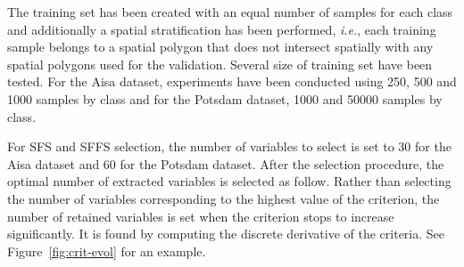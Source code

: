 \documentclass[journal]{IEEEtran}
\begin{document}
    The training set has been created  with an equal number of samples
    for each class and additionally  a spatial stratification has been
    performed, \emph{i.e.}, each training  sample belongs to a spatial
    polygon  that  does  not  intersect  spatially  with  any  spatial
    polygons used  for the validation.   Several size of  training set
    have been  tested.  For  the Aisa  dataset, experiments  have been
    conducted using  250, 500 and  1000 samples  by class and  for the
    Potsdam dataset, 1000 and 50000 samples by class.

    For SFS and  SFFS selection, the number of variables  to select is
    set to  30 for the  Aisa dataset and  60 for the  Potsdam dataset.
    After  the selection  procedure, the  optimal number  of extracted
    variables is selected as follow.  Rather than selecting the number
    of variables corresponding to the  highest value of the criterion,
    the number of  retained variables is set when  the criterion stops
    to increase significantly.  It is  found by computing the discrete
    derivative of the criteria.  See Figure~\ref{fig:crit-evol} for an
    example.
\end{document}
